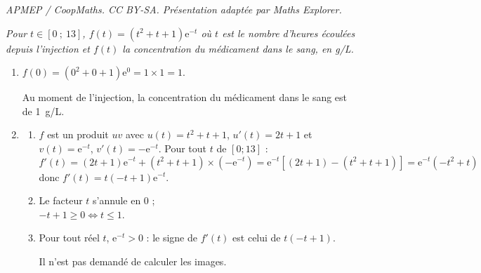 \documentclass[10pt]{article}
\providecommand{\e}{{\mathrm{e}}}
\begin{document}
\noindent\textit{APMEP / CoopMaths. CC BY-SA. Présentation adaptée par Maths Explorer.}\par\medskip
\emph{Pour $t \in [0~;~13]$, $f(t) = \left(t^2 + t + 1\right)\e^{-t}$ où $t$ est le nombre
d'heures écoulées depuis l'injection et $f(t)$ la concentration du médicament dans le sang,
en g/L.}

\begin{enumerate}
	\item $f(0) = \left(0^2 + 0 + 1\right)\e^{0} = 1 \times 1 = 1$.

	Au moment de l'injection, la concentration du médicament dans le sang est de
	1~g/L.

	\item
	\begin{enumerate}
		\item $f$ est un produit $uv$ avec $u(t) = t^2 + t + 1$, $u'(t) = 2t + 1$ et
		$v(t) = \e^{-t}$, $v'(t) = -\e^{-t}$. Pour tout $t$ de $[0 ; 13]$ :
		\[f'(t) = (2t + 1)\e^{-t} + \left(t^2 + t + 1\right)\times\left(-\e^{-t}\right)
		= \e^{-t}\left[(2t + 1) - \left(t^2 + t + 1\right)\right]
		= \e^{-t}\left(-t^2 + t\right)\]
		donc $f'(t) = t(-t + 1)\e^{-t}$.

		\item Le facteur $t$ s'annule en 0 ;\\

		 $-t + 1 \geqslant 0 \iff t \leqslant 1$.

		\begin{center}
		\end{center}

		\item Pour tout réel $t$, $\e^{-t} > 0$ : le signe de $f'(t)$ est celui de
		$t(-t + 1)$.

		\begin{center}
		\end{center}

Il n'est pas demandé de calculer les images.
	\end{enumerate}


\end{enumerate}
\end{document}
